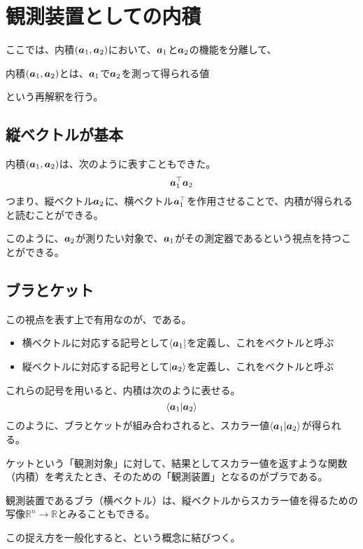 \documentclass[../../../topic_linear-algebra]{subfiles}
\begin{document}
\sectionline
\section{観測装置としての内積}\label{sec:inner-product-as-observer}

ここでは、内積$(\vb*{a}_1, \vb*{a}_2)$において、$\vb*{a}_1$と$\vb*{a}_2$の機能を分離して、
\begin{emphabox}
  \begin{spacebox}
    \begin{center}
      内積$(\vb*{a}_1, \vb*{a}_2)$とは、$\vb*{a}_1$で$\vb*{a}_2$を測って得られる値
    \end{center}
  \end{spacebox}
\end{emphabox}
という再解釈を行う。

\subsection{縦ベクトルが基本}

内積$(\vb*{a}_1, \vb*{a}_2)$は、次のように表すこともできた。
\begin{equation*}
  \vb*{a}_1^\top \vb*{a}_2
\end{equation*}
つまり、縦ベクトル$\vb*{a}_2$に、横ベクトル$\vb*{a}_1^\top$を作用させることで、内積が得られると読むことができる。

\br

このように、$\vb*{a}_2$が測りたい対象で、$\vb*{a}_1$がその測定器であるという視点を持つことができる。

\subsection{ブラとケット}

この視点を表す上で有用なのが、である。

\begin{itemize}
  \item 横ベクトルに対応する記号として$\bra{\vb*{a}_1}$を定義し、これをベクトルと呼ぶ
  \item 縦ベクトルに対応する記号として$\ket{\vb*{a}_2}$を定義し、これをベクトルと呼ぶ
\end{itemize}

これらの記号を用いると、内積は次のように表せる。
\begin{equation*}
  \braket{\vb*{a}_1|\vb*{a}_2}
\end{equation*}
このように、ブラとケットが組み合わされると、スカラー値$\braket{\vb*{a}_1|\vb*{a}_2}$が得られる。

\br

ケットという「観測対象」に対して、結果としてスカラー値を返すような関数（内積）を考えたとき、そのための「観測装置」となるのがブラである。

\br

観測装置であるブラ（横ベクトル）は、縦ベクトルからスカラー値を得るための写像$\mathbb{R}^n \to \mathbb{R}$とみることもできる。

この捉え方を一般化すると、という概念に結びつく。
\end{document}
